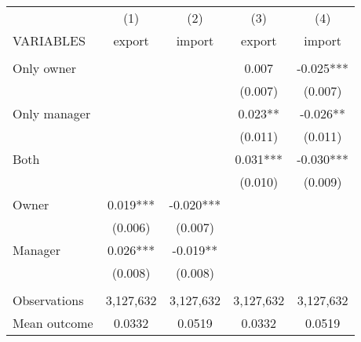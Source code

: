 \begin{tabular}{lcccc} \hline
 & (1) & (2) & (3) & (4) \\
VARIABLES & export & import & export & import \\ \hline
 &  &  &  &  \\
Only owner &  &  & 0.007 & -0.025*** \\
 &  &  & (0.007) & (0.007) \\
Only manager &  &  & 0.023** & -0.026** \\
 &  &  & (0.011) & (0.011) \\
Both &  &  & 0.031*** & -0.030*** \\
 &  &  & (0.010) & (0.009) \\
Owner & 0.019*** & -0.020*** &  &  \\
 & (0.006) & (0.007) &  &  \\
Manager & 0.026*** & -0.019** &  &  \\
 & (0.008) & (0.008) &  &  \\
 &  &  &  &  \\
Observations & 3,127,632 & 3,127,632 & 3,127,632 & 3,127,632 \\
 Mean outcome & 0.0332 & 0.0519 & 0.0332 & 0.0519 \\ \hline
\end{tabular}
